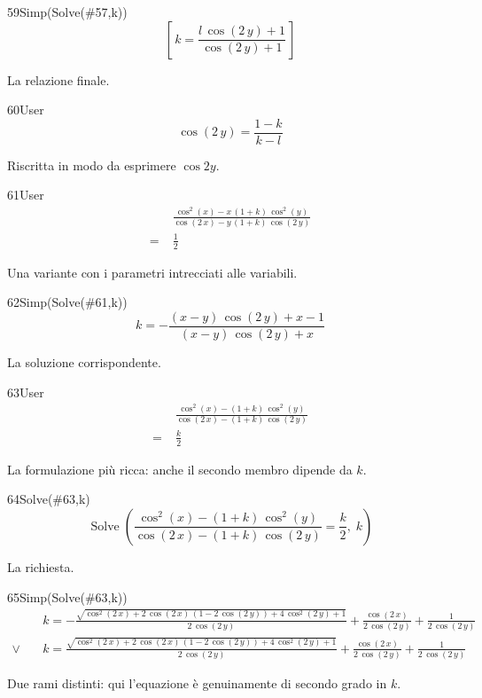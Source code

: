 \begin{espr}{59}{Simp(Solve(\#57,k))}{}
\[
\left[\, k = \frac{l\, \cos\!\left(2\, y\right) + 1}{\cos\!\left(2\, y\right) + 1} \,\right]
\]
\end{espr}
La relazione finale.

\begin{espr}{60}{User}{}
\[
\cos\!\left(2\, y\right) = \frac{1 - k}{k - l}
\]
\end{espr}
Riscritta in modo da esprimere $\cos2y$.

\begin{espr}{61}{User}{}
\begin{align*}
& \frac{\cos^{2}\!\left(x\right) - x\, \left(1 + k\right)\, \cos^{2}\!\left(y\right)}{\cos\!\left(2\, x\right) - y\, \left(1 + k\right)\, \cos\!\left(2\, y\right)} \\
=\;& \frac{1}{2}
\end{align*}
\end{espr}
Una variante con i parametri intrecciati alle variabili.

\begin{espr}{62}{Simp(Solve(\#61,k))}{}
\[
k = -\frac{\left(x - y\right)\, \cos\!\left(2\, y\right) + x - 1}{\left(x - y\right)\, \cos\!\left(2\, y\right) + x}
\]
\end{espr}
La soluzione corrispondente.

\begin{espr}{63}{User}{}
\begin{align*}
& \frac{\cos^{2}\!\left(x\right) - \left(1 + k\right)\, \cos^{2}\!\left(y\right)}{\cos\!\left(2\, x\right) - \left(1 + k\right)\, \cos\!\left(2\, y\right)} \\
=\;& \frac{k}{2}
\end{align*}
\end{espr}
La formulazione più ricca: anche il secondo membro dipende da $k$.

\begin{espr}{64}{Solve(\#63,k)}{}
\[
\operatorname{Solve}\!\left(\frac{\cos^{2}\!\left(x\right) - \left(1 + k\right)\, \cos^{2}\!\left(y\right)}{\cos\!\left(2\, x\right) - \left(1 + k\right)\, \cos\!\left(2\, y\right)} = \frac{k}{2},\; k\right)
\]
\end{espr}
La richiesta.

\begin{espr}{65}{Simp(Solve(\#63,k))}{}
\begin{align*}
& k = -\frac{\sqrt{\cos^{2}\!\left(2\, x\right) + 2\, \cos\!\left(2\, x\right)\, \left(1 - 2\, \cos\!\left(2\, y\right)\right) + 4\, \cos^{2}\!\left(2\, y\right) + 1}}{2\, \cos\!\left(2\, y\right)} + \frac{\cos\!\left(2\, x\right)}{2\, \cos\!\left(2\, y\right)} + \frac{1}{2\, \cos\!\left(2\, y\right)} \\[3pt]
\lor\quad & k = \frac{\sqrt{\cos^{2}\!\left(2\, x\right) + 2\, \cos\!\left(2\, x\right)\, \left(1 - 2\, \cos\!\left(2\, y\right)\right) + 4\, \cos^{2}\!\left(2\, y\right) + 1}}{2\, \cos\!\left(2\, y\right)} + \frac{\cos\!\left(2\, x\right)}{2\, \cos\!\left(2\, y\right)} + \frac{1}{2\, \cos\!\left(2\, y\right)}
\end{align*}
\end{espr}
Due rami distinti: qui l'equazione è genuinamente di secondo grado in $k$.



